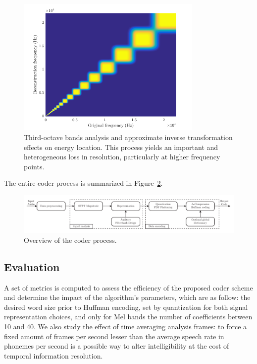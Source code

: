 \documentclass[final,3p,times,twocolumn]{elsarticle}
\begin{document}
\begin{figure}[htbp]
	\centering
		\includegraphics[width=0.8\textwidth]{freq.png}
	\caption{Third-octave bands analysis and approximate inverse transformation effects on energy location. This process yields an important and heterogeneous loss in resolution, particularly at higher frequency points.}
	\label{fig:freq}
\end{figure}

The entire coder process is summarized in Figure~\ref{fig:scheme}.

\begin{figure}[htbp]
	\centering
		\includegraphics[width=1\textwidth]{scheme.pdf}
	\caption{Overview of the coder process.}
	\label{fig:scheme}
\end{figure}

\subsection{Evaluation}
A set of metrics is computed to assess the efficiency of the proposed coder scheme and determine the impact of the algorithm's parameters, which are as follow: the desired word size prior to Huffman encoding, set by quantization for both signal representation choices, and only for Mel bands the number of coefficients between 10 and 40. We also study the effect of time averaging analysis frames: to force a fixed amount of frames per second lesser than the average speech rate in phonemes per second is a possible way to alter intelligibility at the cost of temporal information resolution.\\
\end{document}
